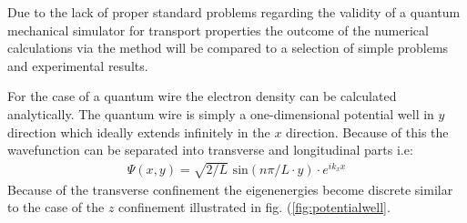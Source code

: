 Due to the lack of proper standard problems regarding the validity of a quantum mechanical simulator for transport properties the outcome of the numerical calculations via the \gfnc{} method will be compared to a selection of simple problems and experimental results.\par
For the case of a quantum wire the electron density can be calculated analytically. The quantum wire is simply a one-dimensional potential well in $y$ direction which ideally extends infinitely in the $x$ direction.
Because of this the wavefunction can be separated into transverse and longitudinal parts i.e:
\begin{align}
\Psi(x,y) = \sqrt{2/L}\text{ sin}(n\pi/L \cdot y) \cdot e^{ik_xx}
\end{align}
Because of the transverse confinement the eigenenergies become discrete similar to the case of the $z$ confinement illustrated in fig. (\ref{fig:potentialwell}.
